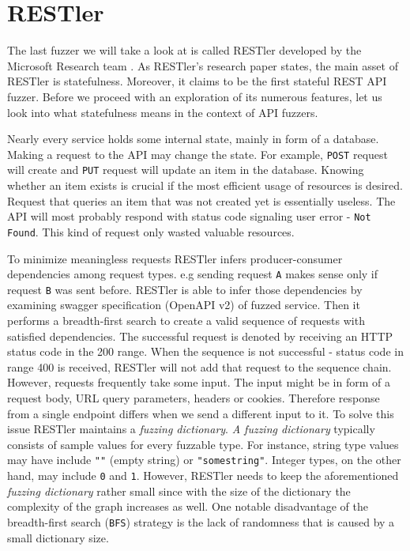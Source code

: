 \section{RESTler}
\label{sec:restler}
The last fuzzer we will take a look at is called RESTler developed by the Microsoft Research team \cite{atlidakis2019restler}. As RESTler's research paper states, the main asset of RESTler is statefulness. Moreover, it claims to be the first stateful REST API fuzzer. Before we proceed with an exploration of its numerous features, let us look into what statefulness means in the context of API fuzzers.

Nearly every service holds some internal state, mainly in form of a database. Making a request to the API may change the state. For example, \texttt{POST} request will create and \texttt{PUT} request will update an item in the database. Knowing whether an item exists is crucial if the most efficient usage of resources is desired. Request that queries an item that was not created yet is essentially useless. The API will most probably respond with status code signaling user error - \texttt{Not Found}. This kind of request only wasted valuable resources.

To minimize meaningless requests RESTler infers producer-consumer dependencies among request types. e.g sending request \texttt{A} makes sense only if request \texttt{B} was sent before. RESTler is able to infer those dependencies by examining swagger specification (OpenAPI v2) of fuzzed service. Then it performs a breadth-first search to create a valid sequence of requests with satisfied dependencies. The successful request is denoted by receiving an HTTP status code in the 200 range. When the sequence is not successful - status code in range 400 is received, RESTler will not add that request to the sequence chain. However, requests frequently take some input. The input might be in form of a request body, URL query parameters, headers or cookies. Therefore response from a single endpoint differs when we send a different input to it. To solve this issue RESTler maintains a \textit{fuzzing dictionary}. \textit{A fuzzing dictionary} typically consists of sample values for every fuzzable type. For instance, string type values may have include \texttt{""} (empty string) or \texttt{"somestring"}. Integer types, on the other hand, may include \texttt{0} and \texttt{1}. However, RESTler needs to keep the aforementioned \textit{fuzzing dictionary} rather small since with the size of the dictionary the complexity of the graph increases as well. One notable disadvantage of the breadth-first search (\texttt{BFS}) strategy is the lack of randomness that is caused by a small dictionary size.

